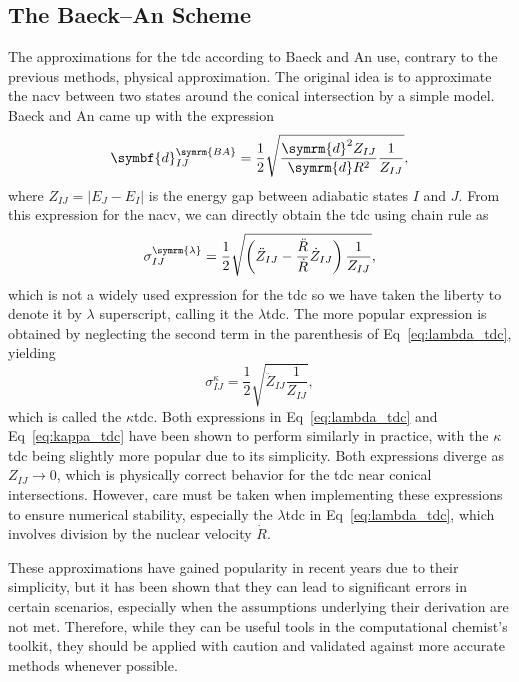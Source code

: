 \subsection{The Baeck--An Scheme}\label{sec:baeck_an}
The approximations for the \acrshort{tdc} according to Baeck and An use, contrary to the previous methods, physical approximation. The original idea is to approximate the \acrshort{nacv} between two states around the conical intersection by a simple model. Baeck and An came up with the expression\supercite{10.1063/1.4975323}
\begin{equation}\label{eq:baeck_an_nacv}
\symbf{d}_{IJ}^{\symrm{BA}}=\frac{1}{2}\sqrt{\frac{\symrm{d}^2Z_{IJ}}{\symrm{d}R^2}\frac{1}{Z_{IJ}}},
\end{equation}
where $Z_{IJ}=\lvert E_J-E_I\rvert$ is the energy gap between adiabatic states $I$ and $J$. From this expression for the \acrshort{nacv}, we can directly obtain the \acrshort{tdc} using chain rule as
\begin{equation}\label{eq:lambda_tdc}
\sigma_{IJ}^{\symrm{\lambda}}=\frac{1}{2}\sqrt{\left(\ddot Z_{IJ}-\frac{\ddot R}{\dot R}\dot Z_{IJ}\right)\frac{1}{Z_{IJ}}},
\end{equation}
which is not a widely used expression for the \acrshort{tdc} so we have taken the liberty to denote it by $\lambda$ superscript, calling it the $\lambda$\acrshort{tdc}.\supercite{10.1021/acs.jctc.5c01176} The more popular expression is obtained by neglecting the second term in the parenthesis of Eq~\eqref{eq:lambda_tdc}, yielding
\begin{equation}\label{eq:kappa_tdc}
\sigma_{IJ}^{\kappa}=\frac{1}{2}\sqrt{\ddot Z_{IJ}\frac{1}{Z_{IJ}}},
\end{equation}
which is called the $\kappa$\acrshort{tdc}.\supercite{10.1021/acs.jctc.1c01080,10.1021/acs.jctc.3c00813,10.12688/openreseurope.13624.2} Both expressions in Eq~\eqref{eq:lambda_tdc} and Eq~\eqref{eq:kappa_tdc} have been shown to perform similarly in practice,\supercite{10.1021/acs.jctc.5c01176} with the $\kappa$\acrshort{tdc} being slightly more popular due to its simplicity. Both expressions diverge as $Z_{IJ}\to 0$, which is physically correct behavior for the \acrshort{tdc} near conical intersections. However, care must be taken when implementing these expressions to ensure numerical stability, especially the $\lambda$\acrshort{tdc} in Eq~\eqref{eq:lambda_tdc}, which involves division by the nuclear velocity $\dot R$.

These approximations have gained popularity in recent years due to their simplicity, but it has been shown that they can lead to significant errors in certain scenarios, especially when the assumptions underlying their derivation are not met. Therefore, while they can be useful tools in the computational chemist's toolkit, they should be applied with caution and validated against more accurate methods whenever possible.\supercite{10.1021/acs.jctc.5c01176}
